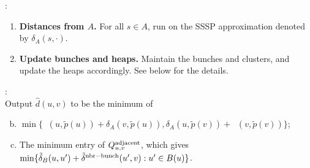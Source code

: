 \documentclass[11pt]{article}
\theoremstyle{definition}
\theoremstyle{remark}
\DeclareMathOperator{\dLNbunch}{\delta_{\tilde{B}}}
\begin{document}
\noindent{}:
\begin{enumerate}[(1)]
     \item \textbf{Distances from $A$.} For all $s\in A$, run  on the SSSP approximation denoted by $\delta_A(s,\cdot)$. %
    \item \textbf{Update bunches and heaps.} Maintain the bunches and clusters, and update the heaps accordingly. See below for the details.  \label{step:update3}
\end{enumerate}

 \noindent{}:\\
    Output $\hat d(u, v)$ to be the minimum of 
    \begin{enumerate}[(a)]\setcounter{enumi}{1}
         \item $\min\{ \dLNbunch(u,\tilde p(u))+\delta_A(v,\tilde p(u)),\delta_A(u,\tilde p(v))+\dLNbunch(v,\tilde p(v))\}$;\label{step:pivot}
        \item The minimum entry of $Q^{\rm{adjacent}}_{u,v}$, which gives $\min\{\tilde \delta_B(u,u')+\tilde \delta^{\rm{nbr-bunch}}(u',v): u'\in B(u)%
        \}$. \label{step:nbr_light1}
    \end{enumerate}
    
\end{document}
